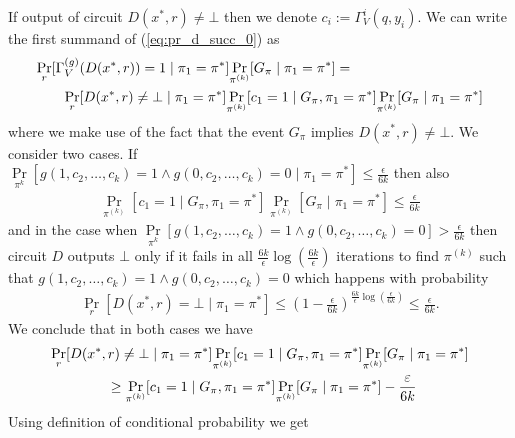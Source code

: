 If output of circuit $D(x^*,r) \neq \bot$ then we denote $c_i := \Gamma_V^{i}(q, y_i)$.
We can write the first summand of (\ref{eq:pr_d_succ_0}) as
\begin{align}
  &\underset{r}{\Pr}[\Gamma_V^{(g)}(D(x^*,r)) = 1 \mid \pi_1 = \pi^*] \underset{\pi^{(k)}}{\Pr}[G_{\pi} \mid \pi_1 = \pi^*] = \notag\\
  &\mbox\qquad \underset{r}{\Pr}[D(x^*,r) \neq \bot \mid \pi_1 = \pi^*]
  \underset{\pi^{(k)}}{\Pr}[c_1 = 1 \mid G_{\pi}, \pi_1 = \pi^*]
  \underset{\pi^{(k)}}{\Pr}[G_{\pi} \mid \pi_1 = \pi^*]
\end{align}
where we make use of the fact that the event $G_{\pi}$ implies $D(x^*, r) \neq \bot$.
We consider two cases.
If $\underset{\pi^{k}}{\Pr}[g(1, c_2, \dots, c_k) = 1 \land g(0, c_2, \dots,c_k ) = 0 \mid \pi_1 = \pi^*] \leq \frac{\epsilon}{6k}$ then also
\begin{align}
  \underset{\pi^{(k)}}{\Pr}[c_1 = 1 \mid G_{\pi}, \pi_1 = \pi^*] \underset{\pi^{(k)}}{\Pr}[G_{\pi} \mid \pi_1 = \pi^*] \leq \frac{\epsilon}{6k}
\end{align}
and in the case when $\underset{\pi^{k}}{\Pr}[g(1, c_2, \dots, c_k) = 1 \land g(0, c_2, \dots,c_k ) = 0] > \frac{\epsilon}{6k}$ then circuit $D$ outputs $\bot$
only if it fails in all $\frac{6k}{\epsilon} \log(\frac{6k}{\epsilon})$ iterations to find $\pi^{(k)}$ such that $g(1, c_2, \dots, c_k) = 1 \land g(0, c_2, \dots, c_k) = 0$
which happens with probability
\begin{align}
\underset{r}{\Pr}[D(x^*,r) = \bot \mid \pi_1 = \pi^*] \leq (1 - \frac{\epsilon}{6k})^{\frac{6k}{\epsilon}\log(\frac{\epsilon}{6k})} \leq \frac{\epsilon}{6k}.
\end{align}
We conclude that in both cases we have
\begin{align}
  &\underset{r}{\Pr}[D(x^*,r) \neq \bot \mid \pi_1 = \pi^*]
  \underset{\pi^{(k)}}{\Pr}[c_1 = 1 \mid G_{\pi}, \pi_1 = \pi^*]
  \underset{\pi^{(k)}}{\Pr}[G_{\pi} \mid \pi_1 = \pi^*] \notag\\
  &\mbox\qquad\qquad \geq \underset{\pi^{(k)}}{\Pr}[c_1 = 1 \mid G_{\pi}, \pi_1 = \pi^*]\underset{\pi^{(k)}}{\Pr}[G_{\pi} \mid \pi_1 = \pi^*] - \frac{\varepsilon}{6k}
\end{align}
Using definition of conditional probability we get
